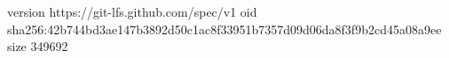 version https://git-lfs.github.com/spec/v1
oid sha256:42b744bd3ae147b3892d50c1ac8f33951b7357d09d06da8f3f9b2cd45a08a9ee
size 349692
